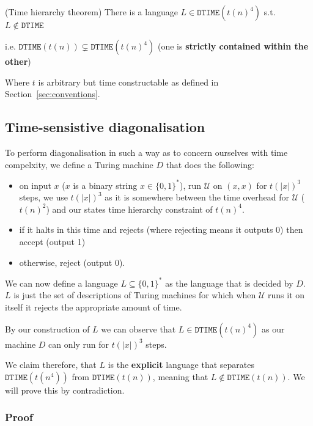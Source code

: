 \documentclass{article}
\begin{document}
\begin{theorem}(Time hierarchy theorem)
  There is a language $L\in \mathbf{\mathtt{DTIME}}(t(n)^{4})$ s.t. $L \notin \mathbf{\mathtt{DTIME}}$

  i.e. $\mathtt{DTIME}(t(n)) \subsetneq \mathtt{DTIME}(t(n)^{4})$ (one is \textbf{strictly contained within the other})

  Where $t$ is arbitrary but time constructable as defined in Section~\ref{sec:conventions}.
\end{theorem}

\subsection{Time-sensistive diagonalisation}
\label{subsec:ts-diagonalisation}

To perform diagonalisation in such a way as to concern ourselves with time compelxity, we define a Turing machine $D$ that does the following:

\begin{itemize}
  \item on input $x$ ($x$ is a binary string $x \in \{ 0,1 \}^*$), run $\mathcal{U}$ on $(x,x)$ for $t(|x|)^{3}$ steps, we use $t(|x|)^{3}$ as it is somewhere between the time overhead for $\mathcal{U}$ ($t(n)^{2}$) and our states time hierarchy constraint of $t(n)^{4}$.
  \item if it halts in this time and rejects (where rejecting means it outputs 0) then accept (output 1)
  \item otherwise, reject (output 0).
\end{itemize}

We can now define a language $L \subseteq \{ 0,1 \}^*$ as the language that is decided by $D$. $L$ is just the set of descriptions of Turing machines for which when $\mathcal{U}$ runs it on itself it rejects the appropriate amount of time.

By our construction of $L$ we can observe that $L \in \mathtt{DTIME}(t(n)^{4})$ as our machine $D$ can only run for $t(|x|)^{3}$ steps.

We claim therefore, that $L$ is the \textbf{explicit} language that separates $\mathtt{DTIME}(t(n^{4}))$ from $\mathtt{DTIME}(t(n))$, meaning that $L \notin \mathtt{DTIME}(t(n))$. We will prove this by contradiction.

\subsubsection{Proof}
\end{document}
